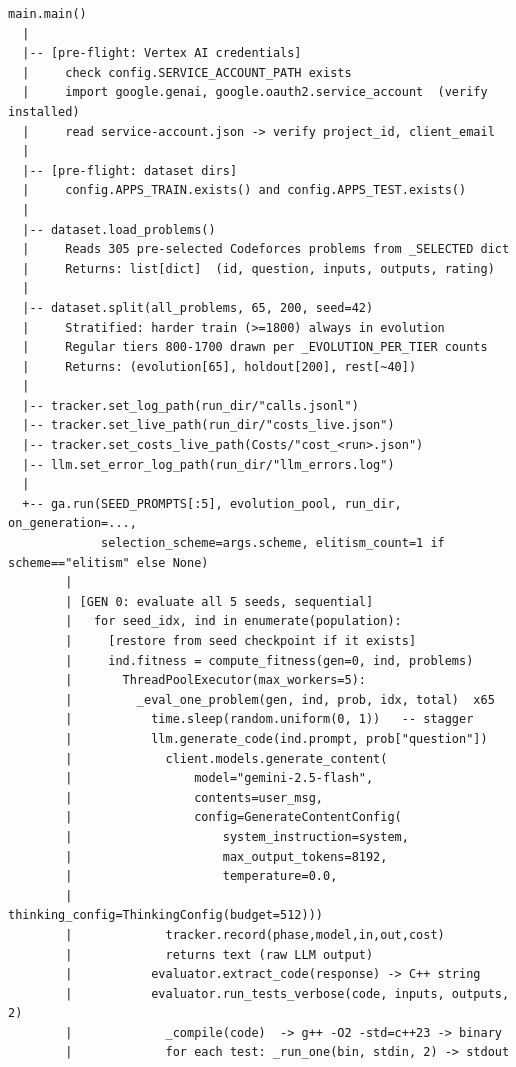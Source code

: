 \documentclass[11pt,a4paper]{report}
\begin{document}
\begin{lstlisting}[style=chain, caption={Complete call tree for one GA run.}]
main.main()
  |
  |-- [pre-flight: Vertex AI credentials]
  |     check config.SERVICE_ACCOUNT_PATH exists
  |     import google.genai, google.oauth2.service_account  (verify installed)
  |     read service-account.json -> verify project_id, client_email
  |
  |-- [pre-flight: dataset dirs]
  |     config.APPS_TRAIN.exists() and config.APPS_TEST.exists()
  |
  |-- dataset.load_problems()
  |     Reads 305 pre-selected Codeforces problems from _SELECTED dict
  |     Returns: list[dict]  (id, question, inputs, outputs, rating)
  |
  |-- dataset.split(all_problems, 65, 200, seed=42)
  |     Stratified: harder train (>=1800) always in evolution
  |     Regular tiers 800-1700 drawn per _EVOLUTION_PER_TIER counts
  |     Returns: (evolution[65], holdout[200], rest[~40])
  |
  |-- tracker.set_log_path(run_dir/"calls.jsonl")
  |-- tracker.set_live_path(run_dir/"costs_live.json")
  |-- tracker.set_costs_live_path(Costs/"cost_<run>.json")
  |-- llm.set_error_log_path(run_dir/"llm_errors.log")
  |
  +-- ga.run(SEED_PROMPTS[:5], evolution_pool, run_dir, on_generation=...,
             selection_scheme=args.scheme, elitism_count=1 if scheme=="elitism" else None)
        |
        | [GEN 0: evaluate all 5 seeds, sequential]
        |   for seed_idx, ind in enumerate(population):
        |     [restore from seed checkpoint if it exists]
        |     ind.fitness = compute_fitness(gen=0, ind, problems)
        |       ThreadPoolExecutor(max_workers=5):
        |         _eval_one_problem(gen, ind, prob, idx, total)  x65
        |           time.sleep(random.uniform(0, 1))   -- stagger
        |           llm.generate_code(ind.prompt, prob["question"])
        |             client.models.generate_content(
        |                 model="gemini-2.5-flash",
        |                 contents=user_msg,
        |                 config=GenerateContentConfig(
        |                     system_instruction=system,
        |                     max_output_tokens=8192,
        |                     temperature=0.0,
        |                     thinking_config=ThinkingConfig(budget=512)))
        |             tracker.record(phase,model,in,out,cost)
        |             returns text (raw LLM output)
        |           evaluator.extract_code(response) -> C++ string
        |           evaluator.run_tests_verbose(code, inputs, outputs, 2)
        |             _compile(code)  -> g++ -O2 -std=c++23 -> binary
        |             for each test: _run_one(bin, stdin, 2) -> stdout

\end{lstlisting}
\end{document}
